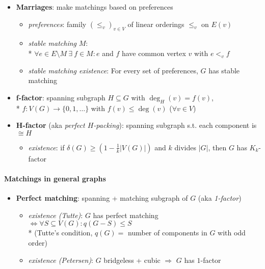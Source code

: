 \begin{itemize}
  \item \textbf{Marriages}: make matchings based on preferences
  \begin{itemize}
    \item \emph{preferences}: family $ (\leq_v)_{v \in V} $ of linear orderings $ \leq_v $ on $ E(v) $
    \item \emph{stable matching} $ M $: \\* $ \forall e \in E \setminus M \ \exists \ f \in M : e $ and $ f $ have common vertex $ v $ with $ e <_v f $
    \item \emph{stable matching existence}: For every set of preferences, $ G $ has stable matching
  \end{itemize}
  \item \textbf{f-factor}: spanning subgraph $ H \subseteq G $ with $ \deg_H(v) = f(v) $, \\*
    $ f: V(G) \to \{ 0,1,\dots \} $ with $ f(v) \leq \deg(v) $ \quad ($ \forall v \in V $)
  \item \textbf{H-factor} (aka \emph{perfect $ H $-packing}): spanning subgraph s.t. each component is $ \cong H $
  \begin{itemize}
    \item \emph{existence}: if $ \delta(G) \geq \left( 1 - \tfrac{1}{k}\vert V(G) \vert \right) $ and $ k $ divides $ \vert G \vert $, then $ G $ has $ K_k $-factor
  \end{itemize}
\end{itemize}

\paragraph{Matchings in general graphs}
\begin{itemize}
  \item \textbf{Perfect matching}: spanning + matching subgraph of $ G $ (aka \emph{1-factor})
  \begin{itemize}
    \item \emph{existence (Tutte)}: $ G $ has perfect matching $ \Leftrightarrow \forall S \subseteq V(G) : q(G-S) \leq S $ \\*
      (Tutte's condition, $ q(G) = $ number of components in $ G $ with odd order)
    \item \emph{existence (Petersen)}: $ G $ bridgeless + cubic $ \Rightarrow $ $ G $ has $ 1 $-factor
  \end{itemize}
\end{itemize}